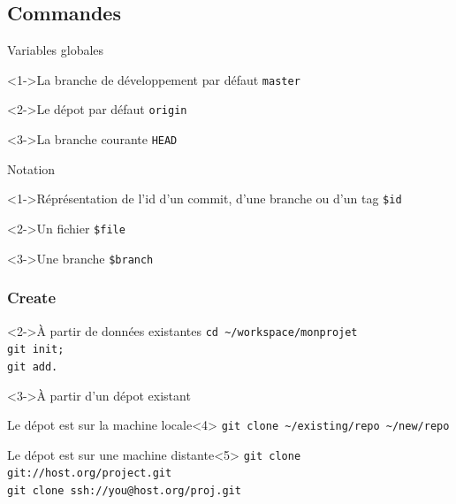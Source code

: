 \subsection{Commandes}


	\begin{frame}[fragile]{Variables globales}
		\begin{block}<1->{La branche de développement par défaut}
			\verb'master'
		\end{block}
		\begin{block}<2->{Le dépot par défaut}
			\verb'origin'
		\end{block}
		\begin{block}<3->{La branche courante}
			\verb'HEAD'
		\end{block}
	\end{frame}
	

	
	\begin{frame}[fragile]{Notation}
		\begin{block}<1->{Réprésentation de l'id d'un commit, d'une branche ou d'un tag}
			\verb'$id'
		\end{block}
		\begin{block}<2->{Un fichier}
			\verb'$file'
		\end{block}
		\begin{block}<3->{Une branche}
			\verb'$branch'
		\end{block}
	\end{frame}

		\begin{frame}[fragile]
			\frametitle{Create}
			\begin{block}<2->{À partir de données existantes}
				\verb'cd ~/workspace/monprojet'\\
				\verb'git init;'\\
				\verb'git add.'
			\end{block}
			\begin{block}<3->{À partir d'un dépot existant}
				\begin{exampleblock}{Le dépot est sur la machine locale}<4>
					\verb'git clone ~/existing/repo ~/new/repo'\\
				\end{exampleblock}

				\begin{exampleblock}{Le dépot est sur une machine distante}<5>
					\verb'git clone git://host.org/project.git'\\
					\verb'git clone ssh://you@host.org/proj.git'
				\end{exampleblock}
			\end{block}

		\end{frame}
		

